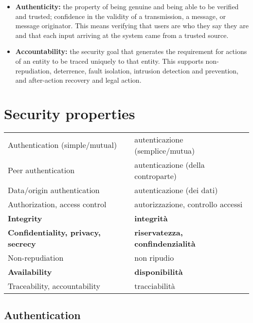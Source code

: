 \begin{itemize}
  \item \textbf{Authenticity:} the property of being genuine and being able to be verified and trusted; confidence in the validity of a transmission, a message, or message originator. This means verifying that users are who they say they are and that each input arriving at the system came from a trusted source.

  \item \textbf{Accountability:} the security goal that generates the requirement for actions of an entity to be traced uniquely to that entity. This supports non-repudiation, deterrence, fault isolation, intrusion detection and prevention, and after-action recovery and legal action.
\end{itemize}

\section{Security properties}\label{cap:secprop}
\begin{center}
  \begin{tabular}{||l l||}
    \hline
    Authentication (simple/mutual)             & autenticazione (semplice/mutua)         \\
    Peer authentication                        & autenticazione (della controparte)      \\
    Data/origin authentication                 & autenticazione (dei dati)               \\
    Authorization, access control              & autorizzazione, controllo accessi       \\
    \textbf{Integrity}                         & \textbf{integrità}                      \\
    \textbf{Confidentiality, privacy, secrecy} & \textbf{riservatezza, confindenzialità} \\
    Non-repudiation                            & non ripudio                             \\
    \textbf{Availability}                      & \textbf{disponibilità}                  \\
    Traceability, accountability               & tracciabilità                           \\
    \hline
  \end{tabular}
\end{center}


\subsection{Authentication}

